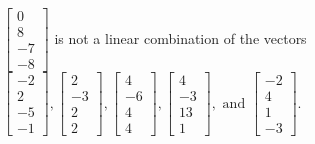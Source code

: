 \begin{exercise}
\begin{exerciseStatement}
  \end{exerciseStatement}
  \begin{exerciseAnswer}
   \(\left[\begin{array}{c}
0 \\
8 \\
-7 \\
-8
\end{array}\right]\) 
  	 is not  
	a linear combination of the vectors \(\left[\begin{array}{c}
-2 \\
2 \\
-5 \\
-1
\end{array}\right] , \left[\begin{array}{c}
2 \\
-3 \\
2 \\
2
\end{array}\right] , \left[\begin{array}{c}
4 \\
-6 \\
4 \\
4
\end{array}\right] , \left[\begin{array}{c}
4 \\
-3 \\
13 \\
1
\end{array}\right] , \text{ and } \left[\begin{array}{c}
-2 \\
4 \\
1 \\
-3
\end{array}\right]\).

	
  


  \end{exerciseAnswer}
\end{exercise}
